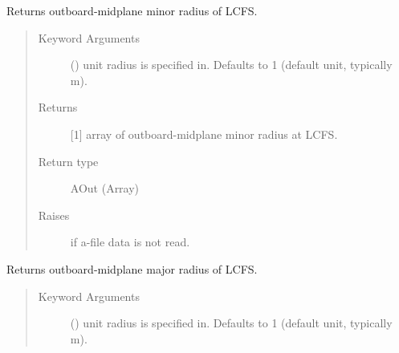 \documentclass[letterpaper,10pt,english]{sphinxmanual}
\begin{document}
\begin{fulllineitems}
\begin{fulllineitems}
\end{fulllineitems}


\begin{fulllineitems}
\label{\detokenize{eqtools:eqtools.eqdskreader.EqdskReader.getAOut}}
Returns outboard-midplane minor radius of LCFS.
\begin{quote}\begin{description}
\item[{Keyword Arguments}] \leavevmode
{} () \textendash{} unit radius is specified in.  Defaults
to 1 (default unit, typically m).

\item[{Returns}] \leavevmode
{[}1{]} array of outboard-midplane minor radius at LCFS.

\item[{Return type}] \leavevmode
AOut (Array)

\item[{Raises}] \leavevmode
{} \textendash{} if a-file data is not read.

\end{description}\end{quote}

\end{fulllineitems}


\begin{fulllineitems}
\label{\detokenize{eqtools:eqtools.eqdskreader.EqdskReader.getRmidOut}}
Returns outboard-midplane major radius of LCFS.
\begin{quote}\begin{description}
\item[{Keyword Arguments}] \leavevmode
{} () \textendash{} unit radius is specified in.  Defaults to
1 (default unit, typically m).


\end{description}
\end{quote}
\end{fulllineitems}
\end{fulllineitems}
\end{document}
